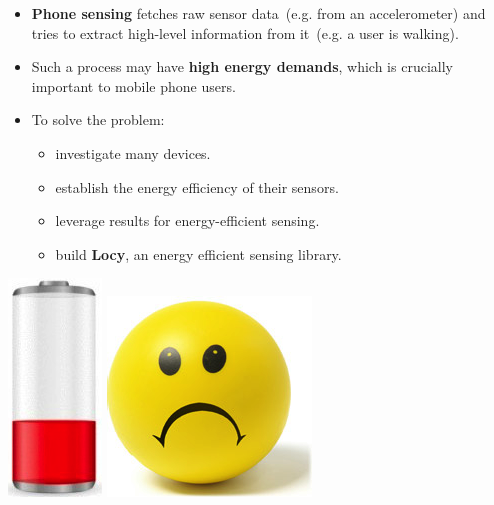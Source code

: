 \documentclass[a2,landscape]{a0poster}
\begin{document}
\begin{itemize}
   \item \textbf{Phone sensing} fetches raw sensor data\ (e.g. from an accelerometer) and tries to extract high-level information from it\ (e.g. a user is walking).
   \item Such a process may have \textbf{high energy demands}, which is crucially important to mobile phone users.
   \item To solve the problem:
	   \begin{itemize}
   			\item investigate many devices.
   			\item establish the energy efficiency of their sensors.
   			\item leverage results for energy-efficient sensing.
   			\item build \textbf{Locy}, an energy efficient sensing library.
	   \end{itemize}
  \end{itemize}
  
\begin{center}
\includegraphics[scale=0.7]{plots/low_battery}
\includegraphics[scale=0.7]{plots/sad_face}
\end{center}
\end{document}
